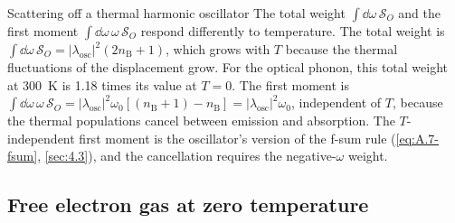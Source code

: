 \begin{workedexample}{Scattering off a thermal harmonic oscillator}
The total weight $\int\dd\omega\,\mathcal{S}_O$ and the first moment $\int\dd\omega\,\omega\,\mathcal{S}_O$ respond differently to temperature. The total weight is $\int\dd\omega\,\mathcal{S}_O = |\lambda_{\mathrm{osc}}|^2(2n_{\mathrm{B}} + 1)$, which grows with $T$ because the thermal fluctuations of the displacement grow. For the optical phonon, this total weight at \SI{300}{K} is 1.18 times its value at $T = 0$. The first moment is $\int\dd\omega\,\omega\,\mathcal{S}_O = |\lambda_{\mathrm{osc}}|^2\omega_0[(n_{\mathrm{B}} + 1) - n_{\mathrm{B}}] = |\lambda_{\mathrm{osc}}|^2\omega_0$, independent of $T$, because the thermal populations cancel between emission and absorption. The $T$-independent first moment is the oscillator's version of the f-sum rule (\cref{eq:A.7-fsum}, \cref{sec:4.3}), and the cancellation requires the negative-$\omega$ weight.
\end{workedexample}

\subsection{Free electron gas at zero temperature}

